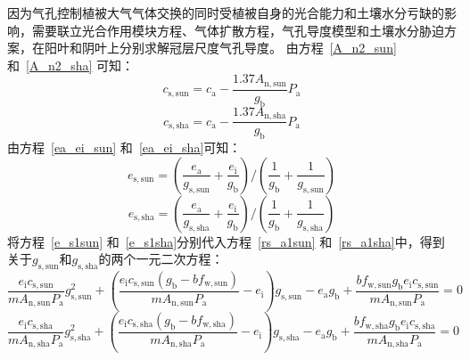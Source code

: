 因为气孔控制植被大气气体交换的同时受植被自身的光合能力和土壤水分亏缺的影响，需要联立光合作用模块方程、气体扩散方程，气孔导度模型和土壤水分胁迫方案，在阳叶和阴叶上分别求解冠层尺度气孔导度。
由方程~\eqref{A_n2_sun} 和~\eqref{A_n2_sha} 可知：
\begin{equation}\label{cs_a1sun}
c_{\mathrm{s,sun}}=c_{\mathrm{a}}-\frac{1.37 A_{\mathrm{n,sun}}}{g_{\mathrm{b}}} P_{\mathrm {a}}
\end{equation}
\begin{equation}\label{cs_a1sha}
c_{\mathrm{s,sha}}=c_{\mathrm{a}}-\frac{1.37 A_{\mathrm{n,sha}}}{g_{\mathrm{b}}} P_{\mathrm {a}}
\end{equation}
由方程~\eqref{ea_ei_sun} 和~\eqref{ea_ei_sha}可知：
\begin{equation}\label{e_s1sun}
e_{\mathrm{s,sun}}=\left(\frac{e_{\mathrm{a}}}{g_{\mathrm{s,sun}}}+\frac{e_{\mathrm{i}}}{g_{\mathrm{b}}}\right) /\left(\frac{1}{g_{\mathrm{b}}}+\frac{1}{g_{\mathrm{s,sun}}}\right)
\end{equation}
\begin{equation}\label{e_s1sha}
e_{\mathrm{s,sha}}=\left(\frac{e_{\mathrm{a}}}{g_{\mathrm{s,sha}}}+\frac{e_{\mathrm{i}}}{g_{\mathrm{b}}}\right) /\left(\frac{1}{g_{\mathrm{b}}}+\frac{1}{g_{\mathrm{s,sha}}}\right)
\end{equation}
将方程~\eqref{e_s1sun} 和~\eqref{e_s1sha}分别代入方程~\eqref{rs_a1sun} 和~\eqref{rs_a1sha}中，得到关于$g_{\mathrm{s,sun}}$和$g_{\mathrm{s,sha}}$的两个一元二次方程：
\begin{equation}\label{ei_cssun}
\frac{e_{\mathrm{i}} c_{\mathrm{s,sun}}}{m A_{\mathrm{n,sun}} P_{\mathrm {a}}} g_{\mathrm{s,sun}}^{2}+\left(\frac{e_{\mathrm{i}} c_{\mathrm{s,sun}}\left(g_{\mathrm{b}} -b f_{\mathrm{w,sun}}\right)}{m A_{\mathrm{n,sun}} P_{\mathrm {a}}}-e_{\mathrm{i}}\right) g_{\mathrm{s,sun}}
-e_{\mathrm{a}} g_{\mathrm{b}}+\frac{b f_{\mathrm{w,sun}} g_{\mathrm{b}} e_{\mathrm{i}} c_{\mathrm{s,sun}}}{m A_{\mathrm{n,sun}} P_{\mathrm {a}}}=0
\end{equation}
\begin{equation}\label{ei_cssha}
\frac{e_{\mathrm{i}} c_{\mathrm{s,sha}}}{m A_{\mathrm{n,sha}} P_{\mathrm {a}}} g_{\mathrm{s,sha}}^{2}+\left(\frac{e_{\mathrm{i}} c_{\mathrm{s,sha}}\left(g_{\mathrm{b}} -b f_{\mathrm{w,sha}}\right)}{m A_{\mathrm{n,sha}} P_{\mathrm {a}}}-e_{\mathrm{i}}\right) g_{\mathrm{s,sha}}
-e_{\mathrm{a}} g_{\mathrm{b}}+\frac{b f_{\mathrm{w,sha}} g_{\mathrm{b}} e_{\mathrm{i}} c_{\mathrm{s,sha}}}{m A_{\mathrm{n,sha}} P_{\mathrm {a}}}=0
\end{equation}
